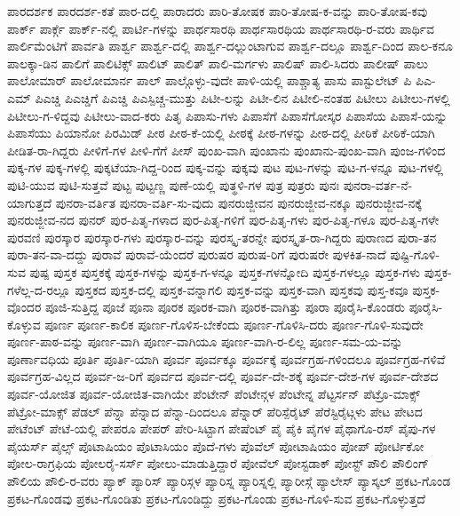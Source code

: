 {ಪಾರದರ್ಶಕ
ಪಾರದರ್ಶ-ಕತೆ
ಪಾರ-ದಲ್ಲಿ
ಪಾರಾದರು
ಪಾರಿ-ತೋಷಕ
ಪಾರಿ-ತೋಷ-ಕ-ವನ್ನು
ಪಾರಿ-ತೋಷ-ಕವು
ಪಾರ್ಕ್
ಪಾರ್ಕ್ಗೆ
ಪಾರ್ಕ್-ನಲ್ಲಿ
ಪಾರ್ಟಿ-ಗಳನ್ನು
ಪಾರ್ಥಸಾರಥಿ
ಪಾರ್ಥಸಾರಥಿಯ
ಪಾರ್ಥಸಾರಥಿ-ರ-ವರು
ಪಾರ್ಥಿವ
ಪಾರ್ಲಿಮೆಂಟಿಗೆ
ಪಾರ್ವತಿ
ಪಾರ್ಶ್ವ
ಪಾರ್ಶ್ವ-ದಲ್ಲಿ
ಪಾರ್ಶ್ವ-ದಲ್ಲುಂಟಾಗುವ
ಪಾರ್ಶ್ವ-ದಲ್ಲೂ
ಪಾರ್ಶ್ವ-ದಿಂದ
ಪಾಲ-ಕನೂ
ಪಾಲಕ್ಕಾ-ಡಿನ
ಪಾಲಿಗೆ
ಪಾಲಿಟಿಕ್ಸ್
ಪಾಲಿಟ್
ಪಾಲಿತ್
ಪಾಲಿ-ಮರ್ಗಳು
ಪಾಲಿಷ್
ಪಾಲಿ-ಸಿದರು
ಪಾಲೀಷ್
ಪಾಲು
ಪಾಲೋಮಾರ್
ಪಾಲೋಮಾರ್ನ
ಪಾಲ್
ಪಾಲ್ಗೊಳ್ಳು-ವುದೇ
ಪಾಳಿ-ಯಲ್ಲಿ
ಪಾಶ್ಚಾತ್ಯ
ಪಾಸು
ಪಾಸ್ಟುಲೇಟ್
ಪಿ
ಪಿಎ-ಎಮ್
ಪಿಎಚ್ಡಿ
ಪಿಎಚ್ಡಿಗೆ
ಪಿಎಚ್ಡಿ
ಪಿಎಸ್ಪಿಚ್ಚ-ಮುತ್ತು
ಪಿಟೀ-ಲನ್ನು
ಪಿಟೀ-ಲಿನ
ಪಿಟೀಲಿ-ನಂತಹ
ಪಿಟೀಲು
ಪಿಟೀಲು-ಗಳಲ್ಲಿ
ಪಿಟೀಲು-ಗ-ಳಿದ್ದವು
ಪಿಟೀಲು-ವಾದ-ಕರು
ಪಿತೃ
ಪಿಪಾಸು-ಗಳು
ಪಿಪಾಸೆಗೆ
ಪಿಪಾಸೆಗೋಸ್ಕರ
ಪಿಪಾಸೆಯ
ಪಿಪಾಸೆ-ಯನ್ನು
ಪಿಪಾಸೆಯು
ಪಿಯಾನೋ
ಪಿರಮಿಡ್
ಪೀಠ
ಪೀಠ-ಕೆ-ಯಲ್ಲಿ
ಪೀಠಕ್ಕೆ
ಪೀಠ-ಗಳನ್ನು
ಪೀಠ-ದಲ್ಲಿ
ಪೀಠಿಕೆ
ಪೀಠಿಕೆ-ಯಾಗಿ
ಪೀಡಿತ-ರಾ-ಗಿದ್ದರು
ಪೀಳಿಗೆ-ಗಳ
ಪೀಳಿ-ಗೆಗೆ
ಪೀಸ್
ಪುಂಖ-ವಾಗಿ
ಪುಂಖಾನು
ಪುಂಖಾನು-ಪುಂಖ-ವಾಗಿ
ಪುಂಜ-ಗಳಿಂದ
ಪುಕ್ಕ-ಗಳ
ಪುಕ್ಕ-ಗಳಲ್ಲಿ
ಪುಕ್ಕಟೆಯಾ-ಗಿದ್ದ-ರಿಂದ
ಪುಕ್ಕ-ವನ್ನು
ಪುಕ್ಕವು
ಪುಟ
ಪುಟ-ಗಳನ್ನು
ಪುಟ-ಗ-ಳನ್ನೂ
ಪುಟ-ಗಳಲ್ಲಿ
ಪುಟಿ-ಯುವ
ಪುಟಿ-ಸುತ್ತವೆ
ಪುಟ್ಟ
ಪುಟ್ಟಣ್ಣ
ಪುಣೆ-ಯಲ್ಲಿ
ಪುತ್ಥಳಿ-ಗಳ
ಪುತ್ರ
ಪುತ್ರರು
ಪುನಃ
ಪುನರಾ-ವರ್ತ-ನೆ-ಯಾಗುತ್ತದೆ
ಪುನರಾ-ವರ್ತಿತ
ಪುನರಾ-ವರ್ತಿ-ಸು-ವುದು
ಪುನರುಜ್ಜೀವನ
ಪುನರುಜ್ಜೀವ-ನಕ್ಕೂ
ಪುನರುಜ್ಜೀವ-ನಕ್ಕೆ
ಪುನರುಜ್ಜೀವ-ನದ
ಪುನರ್
ಪುರ-ಪಿತೃ-ಗಳಾದ
ಪುರ-ಪಿತೃ-ಗಳಿಗೆ
ಪುರ-ಪಿತೃ-ಗಳು
ಪುರ-ಪಿತೃ-ಗಳೂ
ಪುರ-ಪಿತೃ-ಗಳೇ
ಪುರವಣಿ
ಪುರಸ್ಕಾರ
ಪುರಸ್ಕಾರ-ಗಳು
ಪುರಸ್ಕಾರ-ವನ್ನು
ಪುರಸ್ಕೃ-ತರನ್ನೇ
ಪುರಸ್ಕೃತ-ರಾ-ಗಿದ್ದರು
ಪುರಾಣದ
ಪುರಾ-ತನ
ಪುರಾ-ತನ-ವಾ-ದದ್ದು
ಪುರಾವೆ
ಪುರಾವೆ-ಯೆಂದರೆ
ಪುರುಷರ
ಪುರುಷ-ರಿಗೆ
ಪುರುಷರೇ
ಪುಳಕಿತ-ನಾದೆ
ಪುಷ್ಟಿ-ಗೊಳಿ-ಸುವ
ಪುಷ್ಪ
ಪುಸ್ತಕ
ಪುಸ್ತಕಕ್ಕೆ
ಪುಸ್ತಕ-ಗಳನ್ನು
ಪುಸ್ತಕ-ಗ-ಳನ್ನೂ
ಪುಸ್ತಕ-ಗಳನ್ನೋದಿ
ಪುಸ್ತಕ-ಗಳಲ್ಲೂ
ಪುಸ್ತಕ-ಗಳು
ಪುಸ್ತಕ-ಗಳೆಲ್ಲ-ದ-ರಲ್ಲೂ
ಪುಸ್ತಕದ
ಪುಸ್ತಕ-ದಲ್ಲಿ
ಪುಸ್ತಕ-ವನ್ನಾಗಲಿ
ಪುಸ್ತಕ-ವನ್ನು
ಪುಸ್ತಕ-ವಾಗಿ
ಪುಸ್ತಕವು
ಪುಸ್ತ-ಕವೂ
ಪುಸ್ತಕ-ವೊಂದರ
ಪೂಜಿ-ಸುತ್ತಿದ್ದ
ಪೂಜೆ
ಪೂನಾ
ಪೂರಕ
ಪೂರಕ-ವಾಗಿ
ಪೂರಕ-ವಾಗಿತ್ತು
ಪೂರಾ
ಪೂರೈಸಿ-ಕೊಂಡರು
ಪೂರೈಸಿ-ಕೊಳ್ಳುವ
ಪೂರ್ಣ
ಪೂರ್ಣ-ಕಾಲಿಕ
ಪೂರ್ಣ-ಗೊಳಿಸ-ಬೇಕೆಂದು
ಪೂರ್ಣ-ಗೊಳಿಸಿ-ದರು
ಪೂರ್ಣ-ಗೊಳಿ-ಸುವುದೇ
ಪೂರ್ಣ-ಪಾಠ-ವನ್ನು
ಪೂರ್ಣ-ವಾಗಿ
ಪೂರ್ಣ-ವಾಗಿಯೂ
ಪೂರ್ಣ-ವಾಗಿ-ರ-ಲಿಲ್ಲ
ಪೂರ್ಣ-ಸಮ-ಯ-ವನ್ನು
ಪೂರ್ಣಾವಧಿಯ
ಪೂರ್ತಿ
ಪೂರ್ತಿ-ಯಾಗಿ
ಪೂರ್ವ
ಪೂರ್ವಕ್ಕೂ
ಪೂರ್ವಕ್ಕೆ
ಪೂರ್ವಗ್ರಹ-ಗಳಿಂದಲೂ
ಪೂರ್ವಗ್ರಹ-ಗಳಿವೆ
ಪೂರ್ವಗ್ರಹ-ವಿಲ್ಲದ
ಪೂರ್ವ-ಜ-ರಿಗೆ
ಪೂರ್ವದ
ಪೂರ್ವ-ದಲ್ಲಿ
ಪೂರ್ವ-ದೇ-ಶಕ್ಕೆ
ಪೂರ್ವ-ದೇಶ-ಗಳ
ಪೂರ್ವ-ದೇಶದ
ಪೂರ್ವ-ಯೋಜಿತ
ಪೂರ್ವ-ಯೋಜಿತ-ವಾಗಿಯೇ
ಪೆಂಟೇನ್
ಪೆಂಟೇನ್ಗಳ
ಪೆಂಟೇನ್ನ
ಪೆಟ್ಟರ್ಸನ್
ಪೆಟ್ರೊ-ಮಾಕ್ಸ್
ಪೆಟ್ರೋ-ಮಾಕ್ಸ್
ಪೆಡಲ್
ಪೆನ್ನಾ
ಪೆನ್ನಾದ
ಪೆನ್ನಾ-ದಿಂದಲೂ
ಪೆನ್ನಾರ್
ಪೆರಿಸ್ಪೆರೈಟ್
ಪೆರೆಸ್ಟಿರೈಟ್ಗಳು
ಪೇಟ
ಪೇಟದ
ಪೇಟೆಂಟ್
ಪೇಟೆ-ಯಲ್ಲಿ
ಪೇಪರೂ
ಪೇಪರ್
ಪೇರಿ-ಸಿಟ್ಟಾಗ
ಪೇಷೆಂಟ್
ಪೈ
ಪೈಕಿ
ಪೈಗಳ
ಪೈಥಾಗೊ-ರಸ್
ಪೈಪು-ಗಳ
ಪೈಯರ್ಸ್
ಪೈಲ್ಸ್
ಪೊಟಾಷಿಯಂ
ಪೊಟಾಸಿಯಂ
ಪೊದೆ-ಗಳು
ಪೊವೆಲ್
ಪೋಟಾಷಿಯಂ
ಪೋಪ್
ಪೋರ್ಟಿಕೋ
ಪೋಲ-ರಾಗ್ರಫಿಯ
ಪೋಲರೈ-ಸರ್ಸ್
ಪೋಲು-ಮಾಡುತ್ತಿದ್ದಾರೆ
ಪೋವೆಲ್
ಪೋಸ್ಟಡಾಕ್
ಪೋಸ್ಟ್
ಪೌಲಿ
ಪೌಲಿಂಗ್
ಪೌಲಿಯ
ಪೌಲಿ-ರ-ವರು
ಪ್ಯಾಕ್
ಪ್ಯಾರಿಸ್
ಪ್ಯಾರಿಸ್ಗಳ
ಪ್ಯಾರಿಸ್ನ
ಪ್ಯಾರಿಸ್ನಲ್ಲಿ
ಪ್ಯಾರೀಸ್ಗೆ
ಪ್ಯಾಲೇಸ್
ಪ್ಯಾಸ್ಕಲ್
ಪ್ರಕಟ-ಗೊಂಡ
ಪ್ರಕಟ-ಗೊಂಡವು
ಪ್ರಕಟ-ಗೊಂಡಿತು
ಪ್ರಕಟ-ಗೊಂಡಿದ್ದು
ಪ್ರಕಟ-ಗೊಂಡು
ಪ್ರಕಟ-ಗೊಳಿ-ಸುವ
ಪ್ರಕಟ-ಗೊಳ್ಳುತ್ತದೆ
}
